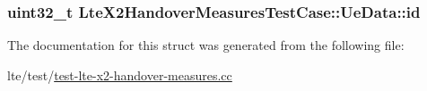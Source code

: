 \subsubsection[{\texorpdfstring{id}{id}}]{\setlength{\rightskip}{0pt plus 5cm}uint32\+\_\+t Lte\+X2\+Handover\+Measures\+Test\+Case\+::\+Ue\+Data\+::id}\hypertarget{structLteX2HandoverMeasuresTestCase_1_1UeData_a4d31c7069fe18297c00fc12575d4a7b6}{}\label{structLteX2HandoverMeasuresTestCase_1_1UeData_a4d31c7069fe18297c00fc12575d4a7b6}


The documentation for this struct was generated from the following file\+:\begin{DoxyCompactItemize}
\item 
lte/test/\hyperlink{test-lte-x2-handover-measures_8cc}{test-\/lte-\/x2-\/handover-\/measures.\+cc}\end{DoxyCompactItemize}
